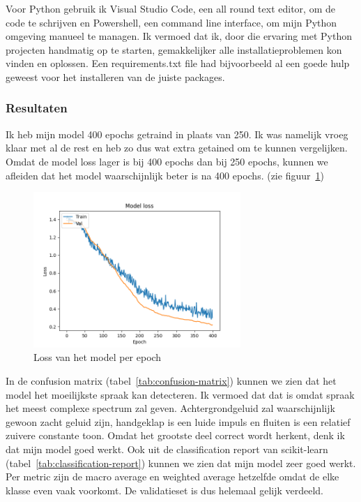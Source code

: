 Voor Python gebruik ik Visual Studio Code, een all round text editor, om de code te schrijven en Powershell, een command line interface, om mijn Python omgeving manueel te managen. Ik vermoed dat ik, door die ervaring met Python projecten handmatig op te starten, gemakkelijker alle installatieproblemen kon vinden en oplossen.
Een requirements.txt file \cite{pip-user-guide} had bijvoorbeeld al een goede hulp geweest voor het installeren van de juiste packages.

\subsubsection{Resultaten}
\label{section:train-results}

Ik heb mijn model 400 epochs getraind in plaats van 250. Ik was namelijk vroeg klaar met al de rest en heb zo dus wat extra getained om te kunnen vergelijken. Omdat de model loss lager is bij 400 epochs dan bij 250 epochs, kunnen we afleiden dat het model waarschijnlijk beter is na 400 epochs. (zie figuur~\ref{fig:cnn-training})

\begin{figure}[ht]
	\centering
	\includegraphics[width=0.7\textwidth]{figuren/cnn_model.png}
	\caption{Loss van het model per epoch}
	\label{fig:cnn-training}
\end{figure}

\newpage

In de confusion matrix (tabel~\ref{tab:confusion-matrix}) kunnen we zien dat het model het moeilijkste spraak kan detecteren.
Ik vermoed dat dat is omdat spraak het meest complexe spectrum zal geven. Achtergrondgeluid zal waarschijnlijk gewoon zacht geluid zijn, handgeklap is een luide impuls en fluiten is een relatief zuivere constante toon. Omdat het grootste deel correct wordt herkent, denk ik dat mijn model goed werkt. Ook uit de classification report van scikit-learn (tabel~\ref{tab:classification-report}) kunnen we zien dat mijn model zeer goed werkt.
Per metric zijn de macro average en weighted average hetzelfde omdat de elke klasse even vaak voorkomt. De validatieset is dus helemaal gelijk verdeeld.

